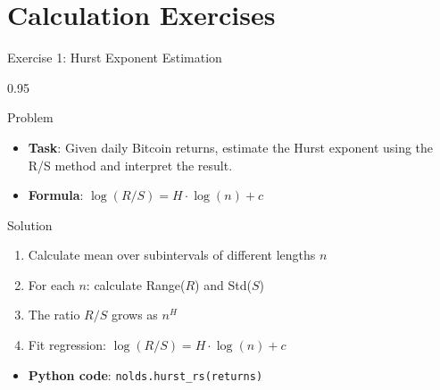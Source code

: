\documentclass[9pt, aspectratio=169, t]{beamer}
\begin{document}
\section{Calculation Exercises}

\begin{frame}{Exercise 1: Hurst Exponent Estimation}
    \begin{cminipage}{0.95\textwidth}
    \begin{alertblock}{Problem}
        \begin{itemize}\setlength{\itemsep}{0pt}
            \item \textbf{Task}: Given daily Bitcoin returns, estimate the Hurst exponent using the R/S method and interpret the result.
            \item \textbf{Formula}: $\log(R/S) = H \cdot \log(n) + c$
        \end{itemize}
    \end{alertblock}

    \vspace{0.2cm}
    \begin{exampleblock}{Solution}
        \begin{enumerate}\setlength{\itemsep}{0pt}
            \item Calculate mean over subintervals of different lengths $n$
            \item For each $n$: calculate Range($R$) and Std($S$)
            \item The ratio $R/S$ grows as $n^H$
            \item Fit regression: $\log(R/S) = H \cdot \log(n) + c$
        \end{enumerate}

        \vspace{0.2cm}
        \begin{itemize}\setlength{\itemsep}{0pt}
            \item \textbf{Python code}: \texttt{nolds.hurst\_rs(returns)}
        \end{itemize}
    \end{exampleblock}
    \end{cminipage}
\end{frame}
\end{document}
